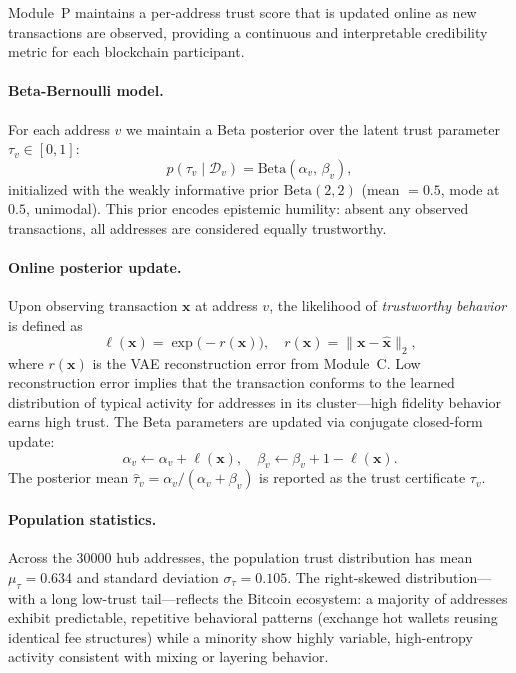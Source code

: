 \documentclass[journal]{IEEEtran}
\begin{document}
Module~P maintains a per-address trust score that is updated online as new
transactions are observed, providing a continuous and interpretable
credibility metric for each blockchain participant.

\paragraph{Beta-Bernoulli model.}
For each address $v$ we maintain a Beta posterior over the latent trust
parameter $\tau_v \in [0,1]$:
\begin{equation}
  p(\tau_v \mid \mathcal{D}_v)
    = \mathrm{Beta}\!\left(\alpha_v,\, \beta_v\right),
  \label{eq:beta_posterior}
\end{equation}
initialized with the weakly informative prior
$\mathrm{Beta}(2, 2)$ (mean $= 0.5$, mode at $0.5$, unimodal).
This prior encodes epistemic humility: absent any observed transactions, all
addresses are considered equally trustworthy.

\paragraph{Online posterior update.}
Upon observing transaction $\mathbf{x}$ at address $v$, the likelihood
of \emph{trustworthy behavior} is defined as
\begin{equation}
  \ell(\mathbf{x}) = \exp\!\bigl(-r(\mathbf{x})\bigr),
  \quad r(\mathbf{x}) = \|\mathbf{x} - \hat{\mathbf{x}}\|_2,
  \label{eq:likelihood}
\end{equation}
where $r(\mathbf{x})$ is the VAE reconstruction error from Module~C.
Low reconstruction error implies that the transaction conforms to the learned
distribution of typical activity for addresses in its cluster—high fidelity
behavior earns high trust.
The Beta parameters are updated via conjugate closed-form update:
\begin{equation}
  \alpha_v \leftarrow \alpha_v + \ell(\mathbf{x}), \quad
  \beta_v  \leftarrow \beta_v  + 1 - \ell(\mathbf{x}).
  \label{eq:beta_update}
\end{equation}
The posterior mean $\hat{\tau}_v = \alpha_v / (\alpha_v + \beta_v)$
is reported as the trust certificate $\tau_v$.

\paragraph{Population statistics.}
Across the \num{30000} hub addresses, the population trust distribution has
mean $\mu_\tau = 0.634$ and standard deviation $\sigma_\tau = 0.105$.
The right-skewed distribution—with a long low-trust tail—reflects the
Bitcoin ecosystem: a majority of addresses exhibit predictable, repetitive
behavioral patterns (exchange hot wallets reusing identical fee structures)
while a minority show highly variable, high-entropy activity consistent
with mixing or layering behavior.
\end{document}
